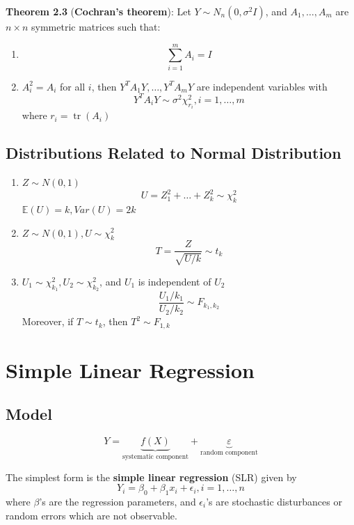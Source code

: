 \documentclass[11pt,a4paper]{article}
\newcommand{\E}{\mathbb{E}}
\DeclareMathOperator{\tr}{tr}
\begin{document}
\textbf{Theorem 2.3} (\textbf{Cochran's theorem}): Let $Y \sim N_n(0, \sigma^2 I)$, and $A_1, \dots, A_m$ are $n \times n$ symmetric matrices such that:

\begin{enumerate}
    \item [(i)]
        \[
        \sum_{i=1}^m A_i = I
        \]
    \item [(ii)]
        $A_i^2 = A_i$ for all $i$, then $Y^TA_1Y, \dots, Y^TA_mY$ are independent variables with
        \[
        Y^TA_iY \sim \sigma^2 \chi_{r_i}^2, i = 1, \dots, m
        \]
        where $r_i = \tr(A_i)$ \par

\end{enumerate}

\subsection{Distributions Related to Normal Distribution}
\begin{enumerate}
    \item [1.]
        $Z \sim N(0, 1)$
        \[
        U = Z_1^2 + \dots + Z_k^2 \sim \chi_k^2
        \]
        $\E(U) = k, Var(U) = 2k$

    \item [2.]
        $Z \sim N(0, 1), U \sim \chi_k^2$
        \[
        T = \frac{Z}{\sqrt{U/k}} \sim t_k
        \]
    
    \item [3.]
        $U_1 \sim \chi_{k_1}^2, U_2 \sim \chi_{k_2}^2$, and $U_1$ is independent of $U_2$
        \[
        \frac{U_1/k_1}{U_2/k_2} \sim F_{k_1, k_2}
        \]
        Moreover, if $T \sim t_k$, then $T^2 \sim F_{1,k}$
\end{enumerate}

\section{Simple Linear Regression}
\subsection{Model}
\[
Y = \underbrace{f(X)}_{\text{systematic component}} + \underbrace{\varepsilon}_{\text{random component}}
\]

The simplest form is the \textbf{simple linear regression} (SLR) given by
\[
Y_i = \beta_0 + \beta_1 x_i + \epsilon_i, i = 1, \dots, n
\]
where $\beta$'s are the regression parameters, and $\epsilon_i$'s are stochastic disturbances or random errors which are not observable. \par
\end{document}
